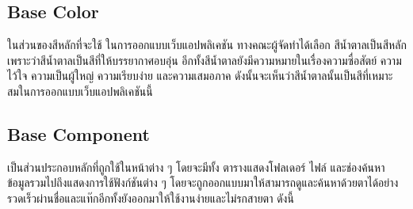 \documentclass[12pt,oneside,openright,a4paper]{cpe-thai-project}
\begin{document}
\subsection{Base Color}
\hspace*{1cm} ในส่วนของสีหลักที่จะใช้ ในการออกแบบเว็บแอปพลิเคชัน ทางคณะผู้จัดทำได้เลือก สีน้ำตาลเป็นสีหลัก เพราะว่าสีน้ำตาลเป็นสีที่ให้บรรยากาศอบอุ่น อีกทั้งสีน้ำตาลยังมีความหมายในเรื่องความซื่อสัตย์ ความไว้ใจ ความเป็นผู้ใหญ่ ความเรียบง่าย และความเสมอภาค ดังนั้นจะเห็นว่าสีน้ำตาลนั้นเป็นสีที่เหมาะสมในการออกแบบเว็บแอปพลิเคชันนี้

\subsection{Base Component}
\hspace*{1cm} เป็นส่วนประกอบหลักที่ถูกใช้ในหน้าต่าง ๆ โดยจะมีทั้ง ตารางแสดงโฟลเดอร์ ไฟล์ และช่องค้นหาข้อมูลรวมไปถึงแสดงการใช้ฟังก์ชันต่าง ๆ โดยจะถูกออกแบบมาให้สามารถดูและค้นหาด้วยตาได้อย่างรวดเร็วผ่านชื่อและแท๊กอีกทั้งยังออกมาให้ใช้งานง่ายและไม่รกสายตา ดังนี้
\end{document}
